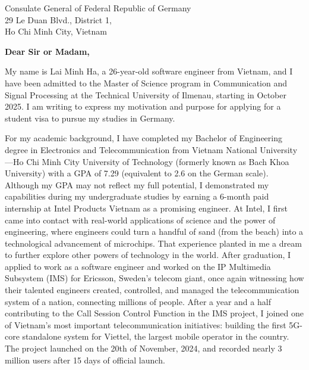 \documentclass[a4paper,11pt]{letter}
\date{}
\begin{document}
\begin{letter}{
    Consulate General of Federal Republic of Germany
    \\ 29 Le Duan Blvd., District 1,
    \\ Ho Chi Minh City, Vietnam
}



\opening{\textbf{Dear Sir or Madam,}}

My name is Lai Minh Ha, a 26-year-old software engineer from Vietnam, and I have been admitted to the Master of Science program in Communication and Signal Processing at the Technical University of Ilmenau, starting in October 2025. I am writing to express my motivation and purpose for applying for a student visa to pursue my studies in Germany.

For my academic background, I have completed my Bachelor of Engineering degree in Electronics and Telecommunication from Vietnam National University—Ho Chi Minh City University of Technology (formerly known as Bach Khoa University) with a GPA of 7.29 (equivalent to 2.6 on the German scale). Although my GPA may not reflect my full potential, I demonstrated my capabilities during my undergraduate studies by earning a 6-month paid internship at Intel Products Vietnam as a promising engineer. At Intel, I first came into contact with real-world applications of science and the power of engineering, where engineers could turn a handful of sand (from the beach) into a technological advancement of microchips. That experience planted in me a dream to further explore other powers of technology in the world. After graduation, I applied to work as a software engineer and worked on the IP Multimedia Subsystem (IMS) for Ericsson, Sweden's telecom giant, once again witnessing how their talented engineers created, controlled, and managed the telecommunication system of a nation, connecting millions of people. After a year and a half contributing to the Call Session Control Function in the IMS project, I joined one of Vietnam’s most important telecommunication initiatives: building the first 5G-core standalone system for Viettel, the largest mobile operator in the country. The project launched on the 20th of November, 2024, and recorded nearly 3 million users after 15 days of official launch.



\end{letter}
\end{document}
